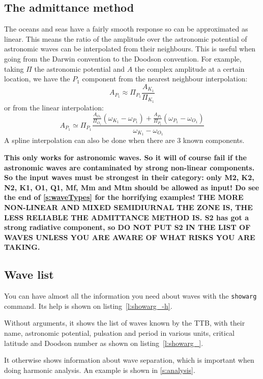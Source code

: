 \documentclass[11pt]{article} %
\providecommand{\code}[1]{\hbox{\lstinline|#1|}}
\providecommand{\cmdhelp}[1]{\end{multicols}\begin{multicols}{2}}
\providecommand{\cmdoutput}[1]{\end{multicols}\begin{multicols}{2}}
\newcommand{\lref}[1]{listing~\ref{#1}}
\begin{document}
\begin{multicols}{2}
\subsection{The admittance method}\label{s:admittance}

The oceans and seas have a fairly smooth response so can be approximated as linear.
This means the ratio of the amplitude over the astronomic potential of astronomic waves can be interpolated from their neighbours.
This is useful when going from the Darwin convention to the Doodson convention.
For example, taking $\Pi$ the astronomic potential and $A$ the complex amplitude at a certain location,
  we have the $P_1$ component from the nearest neighbour interpolation:
$$A_{P_1}\approx\Pi_{P_1}\frac{A_{K_1}}{\Pi_{K_1}}$$
or from the linear interpolation: 
$$A_{P_1}\simeq\Pi_{P_1}\frac{\frac{A_{O_1}}{\Pi_{O_1}}\left(\omega_{K_1}-\omega_{P_1}\right)+\frac{A_{P_1}}{\Pi_{P_1}}\left(\omega_{P_1}-\omega_{O_1}\right)}{\omega_{K_1}-\omega_{O_1}}$$
A spline interpolation can also be done when there are 3 known components.

{\bfseries
This only works for astronomic waves.
So it will of course fail if the astronomic waves are contaminated by strong non-linear components.
So the input waves must be strongest in their category: only M2, K2, N2, K1, O1, Q1, Mf, Mm and Mtm should be allowed as input!
Do see the end of \ref{s:waveTypes} for the horrifying examples!
THE MORE NON-LINEAR AND MIXED SEMIDIURNAL THE ZONE IS, THE LESS RELIABLE THE ADMITTANCE METHOD IS.
S2 has got a strong radiative component, so
DO NOT PUT S2 IN THE LIST OF WAVES UNLESS YOU ARE AWARE OF WHAT RISKS YOU ARE TAKING.
}

\subsection{Wave list}\label{s:list}

You can have almost all the information you need about waves with the \code{showarg} command.
Its help is shown on \lref{l:showarg_-h}.
\cmdhelp{showarg}

Without arguments, it shows the list of waves known by the \ac{TTB}, with their name, astronomic potential, pulsation and period in various units, critical latitude and Doodson number as shown on \lref{l:showarg_}.
\cmdoutput{showarg}

It otherwise shows information about wave separation, which is important when doing harmonic analysis.
An example is shown in \ref{s:analysis}.


\end{multicols}
\end{document}
